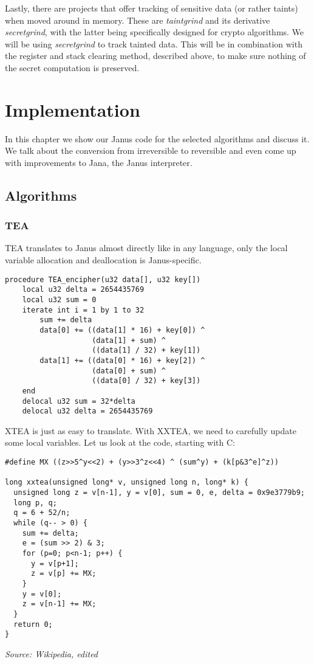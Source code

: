 \documentclass[a4paper,10pt,openright]{memoir}
\newcommand{\term}[1]{\textit{#1}}
\begin{document}
Lastly, there are projects that offer tracking of sensitive data (or 
rather taints) when moved 
around in memory. These are \term{taintgrind} and its derivative 
\term{secretgrind}, with the latter being specifically designed for 
crypto algorithms. We will be using \term{secretgrind} to track tainted data. 
This will be in combination with the register and stack clearing 
method, described above, to make sure nothing of the secret computation 
is preserved.



\chapter{Implementation}

In this chapter we show our Janus code for the selected algorithms and 
discuss it. We talk about the conversion from irreversible to 
reversible and even come up with improvements to Jana, the Janus 
interpreter.


\section{Algorithms}

\subsection{TEA}
\label{sec:impl:tea}

TEA translates to Janus almost directly like in any language, only the 
local variable allocation and deallocation is Janus-specific.

\begin{lstlisting}[language=Janus]
procedure TEA_encipher(u32 data[], u32 key[])
    local u32 delta = 2654435769
    local u32 sum = 0
    iterate int i = 1 by 1 to 32
        sum += delta
        data[0] += ((data[1] * 16) + key[0]) ^
                    (data[1] + sum) ^
                    ((data[1] / 32) + key[1])
        data[1] += ((data[0] * 16) + key[2]) ^
                    (data[0] + sum) ^
                    ((data[0] / 32) + key[3])
    end
    delocal u32 sum = 32*delta
    delocal u32 delta = 2654435769
\end{lstlisting}

XTEA is just as easy to translate. With XXTEA, we need to carefully 
update some local variables. Let us look at the code, starting with C:

\begin{lstlisting}
#define MX ((z>>5^y<<2) + (y>>3^z<<4) ^ (sum^y) + (k[p&3^e]^z))

long xxtea(unsigned long* v, unsigned long n, long* k) {
  unsigned long z = v[n-1], y = v[0], sum = 0, e, delta = 0x9e3779b9;
  long p, q;
  q = 6 + 52/n;
  while (q-- > 0) {
    sum += delta;
    e = (sum >> 2) & 3;
    for (p=0; p<n-1; p++) {
      y = v[p+1];
      z = v[p] += MX;
    }
    y = v[0];
    z = v[n-1] += MX;
  }
  return 0;
}
\end{lstlisting}
\textit{\footnotesize Source: Wikipedia, edited}\\
\end{document}
